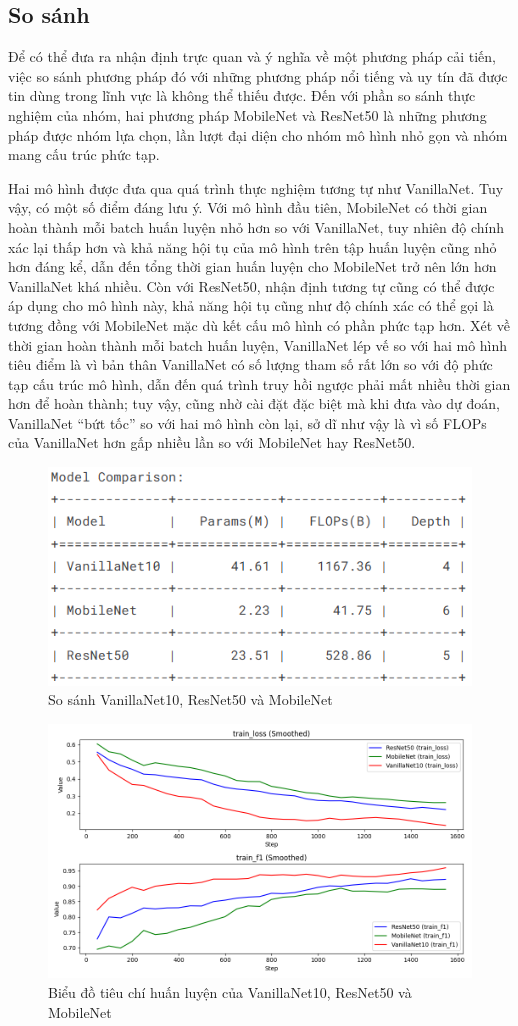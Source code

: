 \documentclass[a4paper,12pt]{article}
\begin{document}
\subsection{So sánh}
Để có thể đưa ra nhận định trực quan và ý nghĩa về một phương pháp cải tiến, việc so sánh phương pháp đó với những phương pháp nổi tiếng và uy tín đã được tin dùng trong lĩnh vực là không thể thiếu được. Đến với phần so sánh thực nghiệm của nhóm, hai phương pháp MobileNet và ResNet50 là những phương pháp được nhóm lựa chọn, lần lượt đại diện cho nhóm mô hình nhỏ gọn và nhóm mang cấu trúc phức tạp.

Hai mô hình được đưa qua quá trình thực nghiệm tương tự như VanillaNet. Tuy vậy, có một số điểm đáng lưu ý. Với mô hình đầu tiên, MobileNet có thời gian hoàn thành mỗi batch huấn luyện nhỏ hơn so với VanillaNet, tuy nhiên độ chính xác lại thấp hơn và khả năng hội tụ của mô hình trên tập huấn luyện cũng nhỏ hơn đáng kể, dẫn đến tổng thời gian huấn luyện cho MobileNet trở nên lớn hơn VanillaNet khá nhiều. Còn với ResNet50, nhận định tương tự cũng có thể được áp dụng cho mô hình này, khả năng hội tụ cũng như độ chính xác có thể gọi là tương đồng với MobileNet mặc dù kết cấu mô hình có phần phức tạp hơn. Xét về thời gian hoàn thành mỗi batch huấn luyện, VanillaNet lép vế so với hai mô hình tiêu điểm là vì bản thân VanillaNet có số lượng tham số rất lớn so với độ phức tạp cấu trúc mô hình, dẫn đến quá trình truy hồi ngược phải mất nhiều thời gian hơn để hoàn thành; tuy vậy, cũng nhờ cài đặt đặc biệt mà khi đưa vào dự đoán, VanillaNet ``bứt tốc'' so với hai mô hình còn lại, sở dĩ như vậy là vì số FLOPs của VanillaNet hơn gấp nhiều lần so với MobileNet hay ResNet50.
\begin{figure}[H]
    \centering
    \includegraphics[width=0.5\linewidth]{model_comparision.png}
    \caption{So sánh VanillaNet10, ResNet50 và MobileNet}
\end{figure}
\begin{figure}[H]
    \centering
    \includegraphics[width=0.8\linewidth]{train_hist_plot_multi_smoothed.png}
    \caption{Biểu đồ tiêu chí huấn luyện của VanillaNet10, ResNet50 và MobileNet}
\end{figure}
\end{document}
